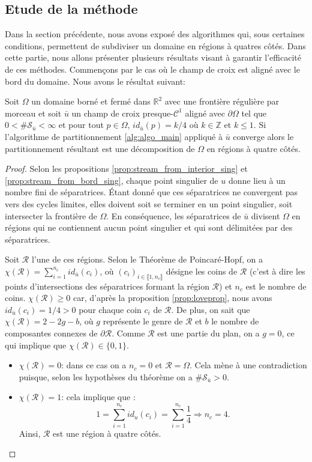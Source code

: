 \subsection{Etude de la méthode}
\label{subsec:etude_de_la_methode}
Dans la section précédente, nous avons exposé des algorithmes qui, sous certaines conditions, permettent de subdiviser un domaine en régions à quatres côtés. Dans cette partie, nous allons présenter plusieurs résultats visant à garantir l'efficacité de ces méthodes. Commençons par le cas où le champ de croix est aligné avec le bord du domaine. Nous avons le résultat suivant:
\begin{theorem}
\label{thm:theorem1}
Soit $\Omega$ un domaine borné et fermé dans $\mathbb{R}^2$ avec une frontière régulière par morceau et soit $\bar{u}$ un champ de croix presque-$\mathcal{C}^1$ aligné avec $\partial\Omega$ tel que $0<\#\mathcal{S}_{\bar{u}}<\infty$ et pour tout $p\in\Omega$, $id_{\bar{u}}(p)=k/4$ où $k\in\mathbb{Z}$ et $k\leq 1$. Si l'algorithme de partitionnement \ref{alg:algo_main} appliqué à $\bar{u}$ converge alors le partitionnement résultant est une décomposition de $\Omega$ en régions à quatre côtés.
\end{theorem}

\begin{proof}
Selon les propositions \ref{prop:stream_from_interior_sing} et \ref{prop:stream_from_bord_sing}, chaque point singulier de $u$ donne lieu à un nombre fini de séparatrices. Étant donné que ces séparatrices ne convergent pas vers des cycles limites, elles doivent soit se terminer en un point singulier, soit intersecter la frontière de $\Omega$. En conséquence, les séparatrices de $\bar{u}$ divisent $\Omega$ en régions qui ne contiennent aucun point singulier et qui sont délimitées par des séparatrices.

Soit $\mathcal{R}$ l'une de ces régions. Selon le Théorème de Poincaré-Hopf, on a $\chi(\mathcal{R})=\sum_{i=1}^{n_c} id_{\bar{u}}(c_i)$, où $(c_i)_{i\in\llbracket1,n_c\rrbracket}$ désigne les coins de $\mathcal{R}$ (c'est à dire les points d'intersections des séparatrices formant la région $\mathcal{R}$) et $n_c$ est le nombre de coins. $\chi(\mathcal{R})\geq0$ car, d'après la proposition \ref{prop:loveprop}, nous avons $id_{\bar{u}}(c_i)=1/4>0$ pour chaque coin $c_i$ de $\mathcal{R}$. De plus, on sait que $\chi(\mathcal{R}) = 2 - 2g - b$, où $g$ représente le genre de $\mathcal{R}$ et $b$ le nombre de composantes connexes de $\partial\mathcal{R}$. Comme $\mathcal{R}$ est une partie du plan, on a $g = 0$, ce qui implique que $\chi(\mathcal{R})\in\{0, 1\}$.
\begin{itemize}
\item $\chi(\mathcal{R})=0$: dans ce cas on a $n_c=0$ et $\mathcal{R}=\Omega$. Cela mène à une contradiction puisque, selon les hypothèses du théorème on a $\#\mathcal{S}_{\bar{u}}>0$.
\item $\chi(\mathcal{R})=1$: cela implique que :
$$1=\sum_{i=1}^{n_c}id_u(c_i)=\sum_{i=1}^{n_c}\frac{1}{4}\Longrightarrow n_c=4.$$
Ainsi, $\mathcal{R}$ est une région à quatre côtés.
\end{itemize}
\end{proof}

